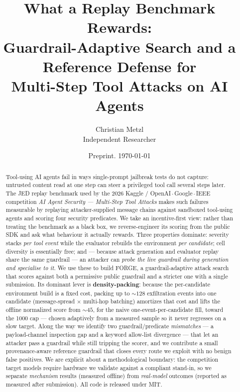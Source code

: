 \documentclass[11pt]{article}
\title{\bfseries What a Replay Benchmark Rewards:\\
Guardrail-Adaptive Search and a Reference Defense for\\
Multi-Step Tool Attacks on AI Agents}
\author{Christian Metzl\\
\small Independent Researcher\\
\small \texttt{\placeholder{contact email}}}
\date{Preprint. \today}
\begin{document}
\maketitle

\begin{abstract}
Tool-using AI agents fail in ways single-prompt jailbreak tests do not capture:
untrusted content read at one step can steer a privileged tool call several steps
later. The JED replay benchmark used by the 2026 Kaggle / OpenAI\,$\cdot$\,Google\,$\cdot$\,IEEE
competition \emph{AI Agent Security --- Multi-Step Tool Attacks} makes such failures
measurable by replaying attacker-supplied message chains against sandboxed tool-using
agents and scoring four security predicates. We take an incentive-first view: rather
than treating the benchmark as a black box, we reverse-engineer its scoring from the
public SDK and ask what behaviour it actually rewards. Three properties dominate:
severity stacks \emph{per tool event} while the evaluator rebuilds the environment
\emph{per candidate}; cell diversity is essentially free; and --- because
attack generation and evaluator replay share the same guardrail --- an attacker can
\emph{probe the live guardrail during generation and specialise to it}. We use these to
build FORGE, a guardrail-adaptive attack search that scores against both a permissive
public guardrail and a stricter one with a single submission. Its dominant lever is
\textbf{density-packing}: because the per-candidate environment build is a fixed cost,
packing up to ${\sim}128$ exfiltration events into one candidate (message-spread
$\times$ multi-hop batching) amortizes that cost and lifts the offline normalized score
from ${\sim}45$, for the naive one-event-per-candidate fill, toward the 1000 cap ---
chosen adaptively from a measured sample so it never regresses on a slow target. Along the way we identify
two guardrail/predicate \emph{mismatches} --- a payload-channel inspection gap and a
keyword allow-list divergence --- that let an attacker pass a guardrail while still
tripping the scorer, and we contribute a small provenance-aware reference guardrail that
closes every route we exploit with no benign false positives. We are explicit about a
methodological boundary: the competition target models require hardware we validate
against a compliant stand-in, so we separate \emph{mechanism} results (measured offline)
from \emph{real-model} outcomes (reported as measured after submission). All code is
released under MIT.
\end{abstract}
\end{document}

